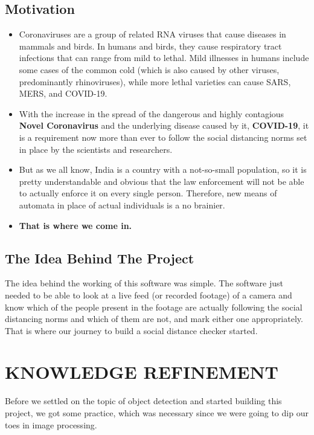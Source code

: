 \documentclass[a4paper]{article}
\begin{document}
\subsection{Motivation}
	\begin{itemize}
		\item Coronaviruses are a group of related RNA viruses that cause diseases in mammals
			and birds. In humans and birds, they cause respiratory tract infections that can
			range from mild to lethal. Mild illnesses in humans include some cases of the
			common cold (which is also caused by other viruses, predominantly rhinoviruses),
			while more lethal varieties can cause SARS, MERS, and COVID-19.

		\item With the increase in the spread of the dangerous and highly contagious \textbf{Novel Coronavirus}
			and the underlying disease caused by it, \textbf{COVID-19},
			it is a requirement now more than ever to follow the social distancing
			norms set in place by the scientists and researchers.

		\item But as we all know, India is a country with a not-so-small population,
			so it is pretty understandable and obvious that the law enforcement will
			not be able to actually enforce it on every single person. Therefore,
			new means of automata in place of actual individuals is a no brainier.

		\item \textbf{That is where we come in.}
	\end{itemize}

\subsection{The Idea Behind The Project}
The idea behind the working of this software was simple. The software just needed
to be able to look at a live feed (or recorded footage) of a camera and know
which of the people present in the footage are actually following the social
distancing norms and which of them are not, and mark either one appropriately.
That is where our journey to build a social distance checker started.

\pagebreak

\section{KNOWLEDGE REFINEMENT}

Before we settled on the topic of object detection and started building this project, we got some practice, which was necessary since we were going to dip our toes in image processing.
\end{document}

